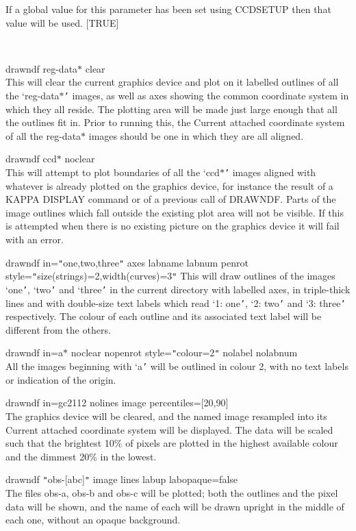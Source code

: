 \documentclass[twoside,11pt]{article}
\newcommand{\htmlref}[2]{#1}
\newcommand{\xref}[3]{#1}
\renewcommand{\_}{\texttt{\symbol{95}}}
\newcommand{\routine}[1]{{\sc #1}}
\newcommand{\xroutine}[1]{\htmlref{{\sc #1}}{#1}}
\newcommand{\sstexamples}[1]{
   \item[Examples:] \mbox{} \\
   \vspace{-3.5ex}
   \begin{description}
      #1
   \end{description}
}
\newcommand{\sstexamplesubsection}[2]{\sloppy \item{\ssttt #1} \mbox{} \\ #2 }
\newcommand{\sstnotes}[1]{\item[Notes:] \mbox{} \\[1.3ex] #1}
\newcommand{\sstitemlist}[1]{
  \mbox{} \\
  \vspace{-3.5ex}
  \begin{itemize}
     #1
  \end{itemize}
}
\newcommand{\sstexamples}[1]{
      \item[Examples:] \\
      \begin{description}
         #1
      \end{description}
      \\
   }
\newcommand{\sstexamplesubsection}[2]{\item[{\ssttt #1}] #2}
\newcommand{\sstnotes}[1]{\item[Notes:] #1 }
\newcommand{\sstitemlist}[1]{
      \begin{itemize}
         #1
      \end{itemize}
      \\
   }
\begin{document}
{{{         If a global value for this parameter has been set using
         \xroutine{CCDSETUP} then that value will be used.
         [TRUE]
      }
   }
   \sstexamples{
      \sstexamplesubsection{
         drawndf reg-data$*$ clear
      }{
         This will clear the current graphics device and plot on it
         labelled outlines of all the `reg-data$*${\tt '} images, as well as
         axes showing the common coordinate system in which they
         all reside.  The plotting area will be made just large enough
         that all the outlines fit in.  Prior to running this, the
         Current attached coordinate system of all the reg-data$*$ images
         should be one in which they are all aligned.
      }
      \sstexamplesubsection{
         drawndf ccd$*$ noclear
      }{
         This will attempt to plot boundaries of all the `ccd$*${\tt '} images
         aligned with whatever is already plotted on the graphics
         device, for instance the result of a KAPPA \xref{DISPLAY}{sun95}{DISPLAY} command
         or of a previous call of \routine{DRAWNDF}.  Parts of the image outlines
         which fall outside the existing plot area will not be visible.
         If this is attempted when there is no existing picture on
         the graphics device it will fail with an error.
      }
      \sstexamplesubsection{
         drawndf in={\tt "}one,two,three{\tt "} axes labname labnum penrot
      }{
              style={\tt "}size(strings)=2,width(curves)=3{\tt "}
         This will draw outlines of the images `one{\tt '}, `two{\tt '} and `three{\tt '}
         in the current directory with labelled axes, in triple-thick
         lines and with double-size text labels which read `1: one{\tt '},
         `2: two{\tt '} and `3: three{\tt '} respectively.  The colour of each
         outline and its associated text label will be different from
         the others.
      }
      \sstexamplesubsection{
         drawndf in=a$*$ noclear nopenrot style={\tt "}colour=2{\tt "} nolabel nolabnum
      }{
         All the images beginning with `a{\tt '} will be outlined in colour 2,
         with no text labels or indication of the origin.
      }
      \sstexamplesubsection{
         drawndf in=gc2112 nolines image percentiles=[20,90]
      }{
         The graphics device will be cleared, and the named image
         resampled into its Current attached coordinate system will
         be displayed.  The data will be scaled such that the brightest
         10\% of pixels are plotted in the highest available colour and
         the dimmest 20\% in the lowest.
      }
      \sstexamplesubsection{
         drawndf {\tt "}obs-[abc]{\tt "} image lines labup labopaque=false
      }{
         The files obs-a, obs-b and obs-c will be plotted; both the
         outlines and the pixel data will be shown, and the name of
         each will be drawn upright in the middle of each one,
         without an opaque background.
      }
   }
   \sstnotes{
      \sstitemlist{

}}}
\end{document}
